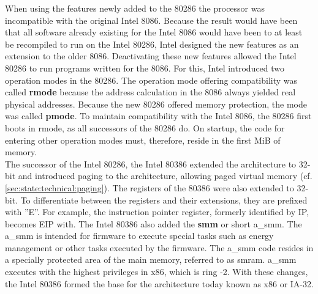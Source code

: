 When using the features newly added to the 80286
the processor was incompatible with the original Intel 8086. Because the result
would have been that all software already existing for the Intel 8086 would have
been to at least be recompiled to run on the Intel 80286, Intel designed the new
features as an extension to the older 8086. Deactivating these new features
allowed the Intel 80286 to run programs written for the 8086. For this, Intel
introduced two operation modes in the 80286. The operation mode offering
compatibility was called \textbf{\gls{rmode}} because the address
calculation in the 8086 always yielded real physical addresses. Because the new
80286 offered memory protection, the mode was called \textbf{\gls{pmode}}. To
maintain compatibility with the Intel 8086, the 80286 first boots in
\gls{rmode}, as all successors of the 80286 do. On startup, the code for
entering other operation modes must, therefore, reside in the first MiB of
memory. \\

The successor of the Intel 80286, the Intel 80386 extended the architecture to
32-bit and introduced paging to the architecture, allowing paged virtual memory
(cf. \ref{sec:state:technical:paging}). The registers of the 80386 were also
extended to 32-bit. To differentiate between the registers and their extensions,
they are prefixed with ''E''. For example, the instruction pointer register,
formerly identified by IP, becomes EIP with. The Intel 80386 also added the
\textbf{\gls{smm}} or short \acrshort{a_smm}. The \acrshort{a_smm} is intended
for firmware to execute special tasks such as energy management or other tasks
executed by the firmware. The \acrshort{a_smm} code resides in a specially
protected area of the main memory, referred to as \gls{smram}. \acrshort{a_smm}
executes with the highest privileges in x86, which is ring -2. With these
changes, the Intel 80386 formed the base for the architecture today known as x86
or IA-32.\\

